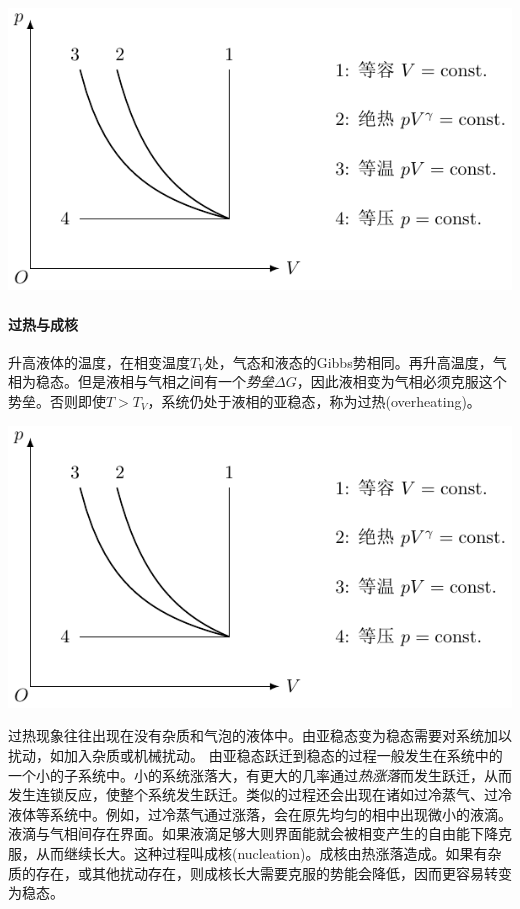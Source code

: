 \begin{center}
	\includegraphics[page=14]{figures/tikz/coordinates.pdf}
	\label{fig:model of liquid-gas phase transition}
\end{center}

\paragraph{过热与成核}

升高液体的温度，在相变温度$T_V$处，气态和液态的Gibbs势相同。再升高温度，气相为稳态。但是液相与气相之间有一个\textit{势垒}$\Delta G$，因此液相变为气相必须克服这个势垒。否则即使$T>T_V$，系统仍处于液相的亚稳态，称为过热(overheating)。
\begin{center}
	\includegraphics[page=15]{figures/tikz/coordinates.pdf}
	\label{fig:overheating}
\end{center}
过热现象往往出现在没有杂质和气泡的液体中。由亚稳态变为稳态需要对系统加以扰动，如加入杂质或机械扰动。%
由亚稳态跃迁到稳态的过程一般发生在系统中的一个小的子系统中。小的系统涨落大，有更大的几率通过\textit{热涨落}而发生跃迁，从而发生连锁反应，使整个系统发生跃迁。类似的过程还会出现在诸如过冷蒸气、过冷液体等系统中。例如，过冷蒸气通过涨落，会在原先均匀的相中出现微小的液滴。液滴与气相间存在界面。如果液滴足够大则界面能就会被相变产生的自由能下降克服，从而继续长大。这种过程叫成核(nucleation)。成核由热涨落造成。如果有杂质的存在，或其他扰动存在，则成核长大需要克服的势能会降低，因而更容易转变为稳态。

